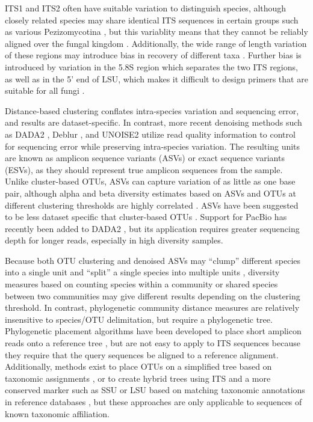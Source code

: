 \documentclass[
  12pt,
]{article}
\begin{document}
ITS1 and ITS2 often have suitable variation to distinguish species, although closely related species may share identical ITS sequences in certain groups such as various Pezizomycotina \autocite{schoch2012},
but this variablity means that they cannot be reliably aligned over the fungal kingdom \autocite{Lindahl2013,Tedersoo2018}.
Additionally, the wide range of length variation of these regions may introduce bias in recovery of different taxa \autocite{ihrmark2012,tedersoo2015,palmer2018}.
Further bias is introduced by variation in the 5.8S region which separates the two ITS regions, as well as in the 5' end of LSU, which makes it difficult to design primers that are suitable for all fungi \autocite{tedersoo2015}.

Distance-based clustering conflates intra-species variation and sequencing error, and results are dataset-specific.
In contrast, more recent denoising methods such as DADA2 \autocite{callahan2017}, Deblur \autocite{amir2017}, and UNOISE2 \autocite{edgar2016} utilize read quality information to control for sequencing error while preserving intra-species variation.
The resulting units are known as amplicon sequence variants (ASVs) or exact sequence variants (ESVs), as they should represent true amplicon sequences from the sample.
Unlike cluster-based OTUs, ASVs can capture variation of as little as one base pair, although alpha and beta diversity estimates based on ASVs and OTUs at different clustering thresholds are highly correlated \autocite{glassman2018,botnen2018}.
ASVs have been suggested to be less dataset specific that cluster-based OTUs \autocite{callahan2017}.
Support for PacBio has recently been added to DADA2 \autocite{callahan2019}, but its application requires greater sequencing depth for longer reads, especially in high diversity samples.

Because both OTU clustering and denoised ASVs may ``clump'' different species into a single unit and ``split'' a single species into multiple units \autocite{ryberg2015}, diversity measures based on counting species within a community or shared species between two communities may give different results depending on the clustering threshold.
In contrast, phylogenetic community distance measures \autocite{wong2016} are relatively insensitive to species/OTU delimitation, but require a phylogenetic tree.
Phylogenetic placement algorithms have been developed to place short amplicon reads onto a reference tree \autocite{matsen2010,berger2011}, but are not easy to apply to ITS sequences because they require that the query sequences be aligned to a reference alignment.
Additionally, methods exist to place OTUs on a simplified tree based on taxonomic assignments \autocite{tedersoo2018}, or to create hybrid trees using ITS and a more conserved marker such as SSU or LSU based on matching taxonomic annotations in reference databases \autocite{fouquier2016}, but these approaches are only applicable to sequences of known taxonomic affiliation.
\end{document}

